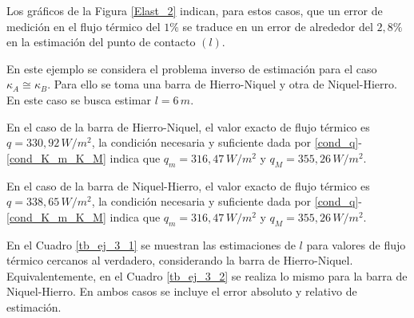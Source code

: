 Los gr\'aficos de la Figura \ref{Elast_2} indican, para estos casos, que un error de medici\'on en el flujo t\'ermico del $1 \%$ se traduce en un error de alrededor del $2,8 \%$ en la estimaci\'on del punto de contacto $(l)$. 

%
\begin{exmpl}
\label{ej3_Cap_7}
En este ejemplo se considera el problema inverso de estimaci\'on para el caso $\kappa_A \cong \kappa_B$.
Para ello se toma 
una barra de Hierro-Niquel y otra de Niquel-Hierro. En este caso se busca estimar $l=6 \, m $.
\end{exmpl}
%
En el caso de la barra de Hierro-Niquel, el valor exacto de flujo t\'ermico es $q=330,92 \, W/m{^{2}}$, la condici\'on necesaria y suficiente dada por \eqref{cond_q}-\eqref{cond_K_m_K_M} indica que
$q_m=316,47 \, W/m{^{2}}$ y $q_M=355,26 \, W/m{^{2}}$.

En el caso de la barra de Niquel-Hierro, el valor exacto de flujo t\'ermico es $q=338,65 \, W/m{^{2}}$, la condici\'on necesaria y suficiente dada por \eqref{cond_q}-\eqref{cond_K_m_K_M} indica que
$q_m=316,47 \, W/m{^{2}}$ y $q_M=355,26 \, W/m{^{2}}$.

En el Cuadro \ref{tb_ej_3_1} se muestran las estimaciones de $l$ para valores de flujo t\'ermico cercanos al verdadero, considerando la barra de Hierro-Niquel. 
Equivalentemente, en el Cuadro \ref{tb_ej_3_2} se realiza lo mismo para la barra de Niquel-Hierro. En ambos casos se incluye el error absoluto y relativo de estimaci\'on.


